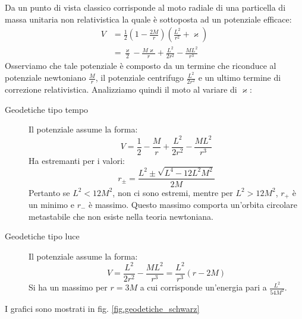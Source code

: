 Da un punto di vista classico corrisponde al moto radiale di una particella di massa unitaria non relativistica la quale è sottoposta ad un potenziale efficace:
\begin{align}
    V &= \frac{1}{2}\left(1-\frac{2M}{r}\right) \left(\frac{L^2}{r^2} + \varkappa \right)\nonumber \\
    &=\frac{\varkappa}{2} - \frac{M\varkappa}{r} + \frac{L^2}{2r^2} - \frac{ML^2}{r^3} 
    \label{eq.potenziale_efficace_geodetiche_schwarz}
\end{align}
Osserviamo che tale potenziale è composto da un termine che riconduce al potenziale newtoniano $\frac{M}{r}$, il potenziale centrifugo $\frac{L^2}{2r^2}$ e un ultimo termine di correzione relativistica. Analizziamo quindi il moto al variare di $\varkappa$:
\begin{description}
    \item[Geodetiche tipo tempo]
    Il potenziale assume la forma:
    \begin{equation*}
        V= \frac{1}{2} - \frac{M}{r} + \frac{L^2}{2r^2} - \frac{ML^2}{r^3} 
    \end{equation*}
Ha estremanti per i valori:
    \begin{equation*}
        r_{\pm} = \frac{L^2\pm \sqrt{L^4-12 L^2 M^2}}{2M}
    \end{equation*}
Pertanto se $L^2 < 12M^2$, non ci sono estremi, mentre per $L^2 >12M^2$, $r_+$ è un minimo e $r_-$ è massimo. Questo massimo comporta un'orbita circolare metastabile che non esiste nella teoria newtoniana.
    \item[Geodetiche tipo luce]
    Il potenziale assume la forma:
    \begin{equation*}
        V = \frac{L^2}{2r^2} - \frac{ML^2}{r^3} = \frac{L^2}{r^3}(r-2M)
    \end{equation*}
Si ha un massimo per $r=3M$ a cui corrisponde un'energia pari a $\frac{L^2}{54M^2}$.
\end{description}
I grafici sono mostrati in fig. \ref{fig.geodetiche_schwarz}
